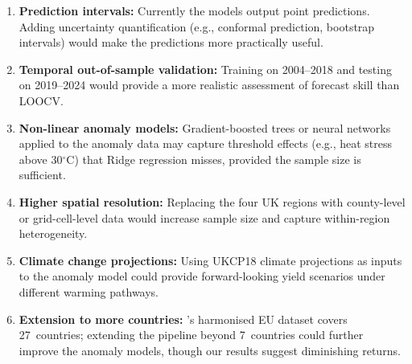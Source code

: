 \documentclass[12pt,a4paper]{report}
\newcommand{\degrees}{$^{\circ}$C}
\begin{document}
\begin{enumerate}
    \item \textbf{Prediction intervals:} Currently the models output point predictions. Adding uncertainty quantification (e.g., conformal prediction, bootstrap intervals) would make the predictions more practically useful.

    \item \textbf{Temporal out-of-sample validation:} Training on 2004--2018 and testing on 2019--2024 would provide a more realistic assessment of forecast skill than LOOCV.

    \item \textbf{Non-linear anomaly models:} Gradient-boosted trees or neural networks applied to the anomaly data may capture threshold effects (e.g., heat stress above 30\degrees{}) that Ridge regression misses, provided the sample size is sufficient.

    \item \textbf{Higher spatial resolution:} Replacing the four UK regions with county-level or grid-cell-level data would increase sample size and capture within-region heterogeneity.

    \item \textbf{Climate change projections:} Using UKCP18 climate projections as inputs to the anomaly model could provide forward-looking yield scenarios under different warming pathways.

    \item \textbf{Extension to more countries:} \citet{ronchetti2024}'s harmonised EU dataset covers 27~countries; extending the pipeline beyond 7~countries could further improve the anomaly models, though our results suggest diminishing returns.
\end{enumerate}



\end{document}
